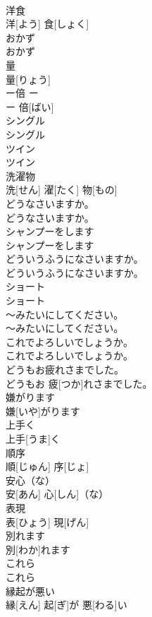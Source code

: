 \documentclass[8pt]{extreport}
\begin{document}
\begin{CJK}{UTF8}{min}
\\	洋食	
\\	洋[よう] 食[しょく]		
\\	おかず	
\\	おかず		
\\	量	
\\	量[りょう]		
\\	ー倍	ー 
\\	ー 倍[ばい]		
\\	シングル	
\\	シングル		
\\	ツイン	
\\	ツイン		
\\	洗濯物	
\\	洗[せん] 濯[たく] 物[もの]		
\\	どうなさいますか。	
\\	どうなさいますか。		
\\	シャンプーをします	
\\	シャンプーをします		
\\	どういうふうになさいますか。	
\\	どういうふうになさいますか。		
\\	ショート	
\\	ショート		
\\	～みたいにしてください。	
\\	～みたいにしてください。		
\\	これでよろしいでしょうか。	
\\	これでよろしいでしょうか。		
\\	どうもお疲れさまでした。	
\\	どうもお 疲[つか]れさまでした。		
\\	嫌がります	
\\	嫌[いや]がります		
\\	上手く	
\\	上手[うま]く		
\\	順序	
\\	順[じゅん] 序[じょ]		
\\	安心（な）	
\\	安[あん] 心[しん]（な）		
\\	表現	
\\	表[ひょう] 現[げん]		
\\	別れます	
\\	別[わか]れます		
\\	これら	
\\	これら		
\\	縁起が悪い	
\\	縁[えん] 起[ぎ]が 悪[わる]い		

\end{CJK}
\end{document}

